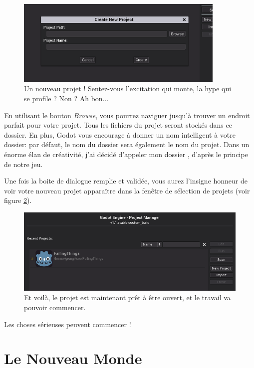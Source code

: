 \begin{figure}
  \begin{center}
    \includegraphics[width=10cm]{img/lvl1-screen2.png}
  \end{center}
  \caption{\label{lvl1-screen2} Un nouveau projet ! Sentez-vous l'excitation qui monte, la hype qui se profile ? Non ? Ah bon...}
\end{figure}

En utilisant le bouton \emph{Browse}, vous pourrez naviguer jusqu'à trouver un endroit parfait pour votre projet. Tous les fichiers du projet seront stockés dans ce dossier. En plus, Godot vous encourage à donner un nom intelligent à votre dossier: par défaut, le nom du dossier sera également le nom du projet. Dans un énorme élan de créativité, j'ai décidé d'appeler mon dossier , d'après le principe de notre jeu.

Une fois la boite de dialogue remplie et validée, vous aurez l'insigne honneur de voir votre nouveau projet apparaître dans la fenêtre de sélection de projets (voir figure \ref{lvl1-screen3}).

\begin{figure}
  \begin{center}
    \includegraphics[width=12cm]{img/lvl1-screen3.png}
  \end{center}
  \caption{\label{lvl1-screen3} Et voilà, le projet est maintenant prêt à être ouvert, et le travail va pouvoir commencer.}
\end{figure}

Les choses sérieuses peuvent commencer !

\section{Le Nouveau Monde}


